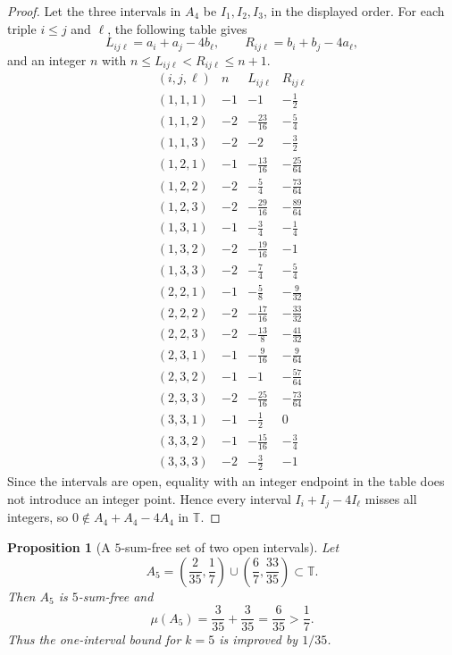 \documentclass{article}
\newtheorem{proposition}{Proposition}
\begin{document}
\begin{proof}
Let the three intervals in \(A_4\) be \(I_1,I_2,I_3\), in the displayed order.
For each triple \(i\leq j\) and \(\ell\), the following table gives
\[
    L_{ij\ell}=a_i+a_j-4b_\ell,
    \qquad
    R_{ij\ell}=b_i+b_j-4a_\ell,
\]
and an integer \(n\) with \(n\leq L_{ij\ell}<R_{ij\ell}\leq n+1\).
\[
\begin{array}{c|c|c|c}
(i,j,\ell) & n & L_{ij\ell} & R_{ij\ell} \\
\hline
(1,1,1) & -1 & -1 & -\frac12 \\
(1,1,2) & -2 & -\frac{23}{16} & -\frac54 \\
(1,1,3) & -2 & -2 & -\frac32 \\
(1,2,1) & -1 & -\frac{13}{16} & -\frac{25}{64} \\
(1,2,2) & -2 & -\frac54 & -\frac{73}{64} \\
(1,2,3) & -2 & -\frac{29}{16} & -\frac{89}{64} \\
(1,3,1) & -1 & -\frac34 & -\frac14 \\
(1,3,2) & -2 & -\frac{19}{16} & -1 \\
(1,3,3) & -2 & -\frac74 & -\frac54 \\
(2,2,1) & -1 & -\frac58 & -\frac9{32} \\
(2,2,2) & -2 & -\frac{17}{16} & -\frac{33}{32} \\
(2,2,3) & -2 & -\frac{13}{8} & -\frac{41}{32} \\
(2,3,1) & -1 & -\frac9{16} & -\frac9{64} \\
(2,3,2) & -1 & -1 & -\frac{57}{64} \\
(2,3,3) & -2 & -\frac{25}{16} & -\frac{73}{64} \\
(3,3,1) & -1 & -\frac12 & 0 \\
(3,3,2) & -1 & -\frac{15}{16} & -\frac34 \\
(3,3,3) & -2 & -\frac32 & -1
\end{array}
\]
Since the intervals are open, equality with an integer endpoint in the table
does not introduce an integer point. Hence every interval
\(I_i+I_j-4I_\ell\) misses all integers, so \(0\notin A_4+A_4-4A_4\) in
\(\mathbb T\).
\end{proof}

\begin{proposition}[A \(5\)-sum-free set of two open intervals]
Let
\[
    A_5=
    \left(\frac2{35},\frac17\right)
    \cup
    \left(\frac67,\frac{33}{35}\right)
    \subset \mathbb T.
\]
Then \(A_5\) is \(5\)-sum-free and
\[
    \mu(A_5)
    =
    \frac3{35}+\frac3{35}
    =
    \frac6{35}
    >
    \frac17.
\]
Thus the one-interval bound for \(k=5\) is improved by \(1/35\).
\end{proposition}
\end{document}
